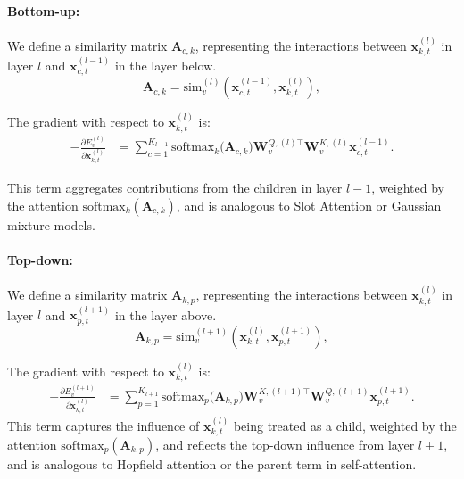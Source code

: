\documentclass{article}
\begin{document}
\paragraph{Bottom-up:}

We define a similarity matrix \(\bm{A}_{c,k}\), representing the interactions between \(\bm{x}_{k,t}^{(l)}\) in layer \(l\) and \(\bm{x}_{c,t}^{(l-1)}\) in the layer below.
\begin{equation}
\bm{A}_{c,k} = \mathrm{sim}_{v}^{(l)}(\bm{x}_{c,t}^{(l-1)}, \bm{x}_{k,t}^{(l)}),
\end{equation}

The gradient with respect to \(\bm{x}_{k,t}^{(l)}\) is:
\begin{equation}
\begin{aligned}
-\frac{\partial E_{v}^{(l)}}{\partial \bm{x}_{k,t}^{(l)}}
&=
\sum_{c=1}^{K_{l-1}}
\mathrm{softmax}_{k}\bigl(\bm{A}_{c,k}\bigr)
\bm{W}_{v}^{Q,(l)\top} \bm{W}_{v}^{K,(l)} \bm{x}_{c,t}^{(l-1)}.
\end{aligned}
\end{equation}

This term aggregates contributions from the children in layer \(l-1\), weighted by the attention \(\mathrm{softmax}_{k}(\bm{A}_{c,k})\), and is analogous to Slot Attention or Gaussian mixture models.

\paragraph{Top-down:}

We define a similarity matrix \(\bm{A}_{k,p}\), representing the interactions between \(\bm{x}_{k,t}^{(l)}\) in layer \(l\) and \(\bm{x}_{p,t}^{(l+1)}\) in the layer above.
\begin{equation}
\bm{A}_{k,p} = \mathrm{sim}_{v}^{(l+1)}(\bm{x}_{k,t}^{(l)}, \bm{x}_{p,t}^{(l+1)}),
\end{equation}

The gradient with respect to \(\bm{x}_{k,t}^{(l)}\) is:
\begin{equation}
\begin{aligned}
-\frac{\partial E_{v}^{(l+1)}}{\partial \bm{x}_{k,t}^{(l)}}
&=
\sum_{p=1}^{K_{l+1}}
\mathrm{softmax}_{p}\bigl(\bm{A}_{k,p}\bigr)
\bm{W}_{v}^{K,(l+1)\top} \bm{W}_{v}^{Q,(l+1)} \bm{x}_{p,t}^{(l+1)}.
\end{aligned}
\end{equation}
This term captures the influence of \(\bm{x}_{k,t}^{(l)}\) being treated as a child, weighted by the attention \(\mathrm{softmax}_{p}(\bm{A}_{k,p})\), and reflects the top-down influence from layer \(l+1\), and is analogous to Hopfield attention or the parent term in self-attention.
\end{document}

